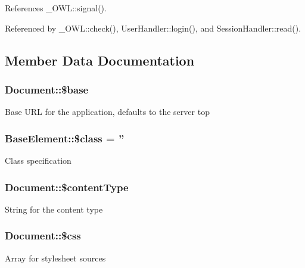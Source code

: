 References \_\-OWL::signal().



Referenced by \_\-OWL::check(), UserHandler::login(), and SessionHandler::read().



\subsection{Member Data Documentation}
\subsubsection[{\$base}]{\setlength{\rightskip}{0pt plus 5cm}Document::\$base}\label{classDocument_a5a5f2c002eaff3b5c0d0c2ef85b3496d}
Base URL for the application, defaults to the server top 
\subsubsection[{\$class}]{\setlength{\rightskip}{0pt plus 5cm}BaseElement::\$class = ''}\label{classBaseElement_a99976a8e967db92e7800309f359b0803}
Class specification 
\subsubsection[{\$contentType}]{\setlength{\rightskip}{0pt plus 5cm}Document::\$contentType}\label{classDocument_ab1cd325e8c6dc65ec0512e759d120b0e}
String for the content type 
\subsubsection[{\$css}]{\setlength{\rightskip}{0pt plus 5cm}Document::\$css}\label{classDocument_a635d9d19a754911129ac92e8b00f4f31}
Array for stylesheet sources 
